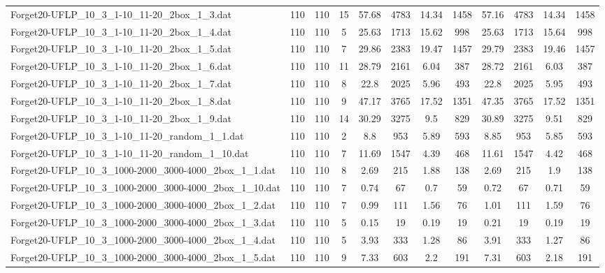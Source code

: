 \begin{sidewaystable}[!ht]
{\begin{tabular}{lccccccccccc}
Forget20-UFLP\_10\_3\_1-10\_11-20\_2box\_1\_3.dat & 110 & 110 & 15 & 57.68 & 4783 & 14.34 & 1458 & 57.16 & 4783 & 14.34 & 1458 \\
Forget20-UFLP\_10\_3\_1-10\_11-20\_2box\_1\_4.dat & 110 & 110 & 5 & 25.63 & 1713 & 15.62 & 998 & 25.63 & 1713 & 15.64 & 998 \\
Forget20-UFLP\_10\_3\_1-10\_11-20\_2box\_1\_5.dat & 110 & 110 & 7 & 29.86 & 2383 & 19.47 & 1457 & 29.79 & 2383 &  \textcolor{blue2}{19.46} & 1457 \\
Forget20-UFLP\_10\_3\_1-10\_11-20\_2box\_1\_6.dat & 110 & 110 & 11 & 28.79 & 2161 & 6.04 & 387 & 28.72 & 2161 & 6.03 & 387 \\
Forget20-UFLP\_10\_3\_1-10\_11-20\_2box\_1\_7.dat & 110 & 110 & 8 & 22.8 & 2025 & 5.96 & 493 & 22.8 & 2025 &  \textcolor{blue2}{5.95} & 493 \\
Forget20-UFLP\_10\_3\_1-10\_11-20\_2box\_1\_8.dat & 110 & 110 & 9 & 47.17 & 3765 &  \textcolor{blue2}{17.52} & 1351 & 47.35 & 3765 &  \textcolor{blue2}{17.52} & 1351 \\
Forget20-UFLP\_10\_3\_1-10\_11-20\_2box\_1\_9.dat & 110 & 110 & 14 & 30.29 & 3275 & 9.5 & 829 & 30.89 & 3275 & 9.51 & 829 \\
Forget20-UFLP\_10\_3\_1-10\_11-20\_random\_1\_1.dat & 110 & 110 & 2 & 8.8 & 953 & 5.89 & 593 & 8.85 & 953 &  \textcolor{blue2}{5.85} & 593 \\
Forget20-UFLP\_10\_3\_1-10\_11-20\_random\_1\_10.dat & 110 & 110 & 7 & 11.69 & 1547 & 4.39 & 468 & 11.61 & 1547 & 4.42 & 468 \\
Forget20-UFLP\_10\_3\_1000-2000\_3000-4000\_2box\_1\_1.dat & 110 & 110 & 8 & 2.69 & 215 &  \textcolor{blue2}{1.88} & 138 & 2.69 & 215 & 1.9 & 138 \\
Forget20-UFLP\_10\_3\_1000-2000\_3000-4000\_2box\_1\_10.dat & 110 & 110 & 7 & 0.74 & 67 &  \textcolor{blue2}{0.7} & 59 & 0.72 & 67 & 0.71 & 59 \\
Forget20-UFLP\_10\_3\_1000-2000\_3000-4000\_2box\_1\_2.dat & 110 & 110 & 7 &  \textcolor{blue2}{0.99} & 111 & 1.56 & 76 & 1.01 & 111 & 1.59 & 76 \\
Forget20-UFLP\_10\_3\_1000-2000\_3000-4000\_2box\_1\_3.dat & 110 & 110 & 5 &  \textcolor{blue2}{0.15} & 19 & 0.19 & 19 & 0.21 & 19 & 0.19 & 19 \\
Forget20-UFLP\_10\_3\_1000-2000\_3000-4000\_2box\_1\_4.dat & 110 & 110 & 5 & 3.93 & 333 & 1.28 & 86 & 3.91 & 333 &  \textcolor{blue2}{1.27} & 86 \\
Forget20-UFLP\_10\_3\_1000-2000\_3000-4000\_2box\_1\_5.dat & 110 & 110 & 9 & 7.33 & 603 & 2.2 & 191 & 7.31 & 603 &  \textcolor{blue2}{2.18} & 191 \\

\end{tabular}}
\end{sidewaystable}
